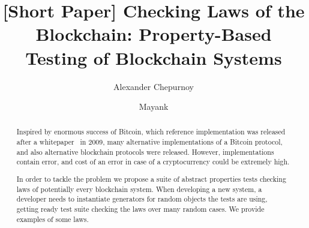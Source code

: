 \documentclass[]{llncs}   %
\begin{document}
\title{[Short Paper] Checking Laws of the Blockchain: Property-Based Testing of Blockchain Systems}

\author{Alexander Chepurnoy \and Mayank}
\maketitle

\begin{abstract}
Inspired by enormous success of Bitcoin, which reference implementation was released after a whitepaper~\cite{Nakamoto2008} in 2009, many alternative implementations of a Bitcoin protocol, and also alternative blockchain protocols were released. However, implementations contain error, and cost of an error in case of a cryptocurrency could be extremely high. 

In order to tackle the problem we propose a suite of abstract properties tests checking laws of potentially every blockchain system. 
When developing a new system, a developer needs to instantiate generators for random objects the tests are using, getting ready test suite checking the laws over many random cases. We provide examples of some laws.
\end{abstract}











\end{document}
